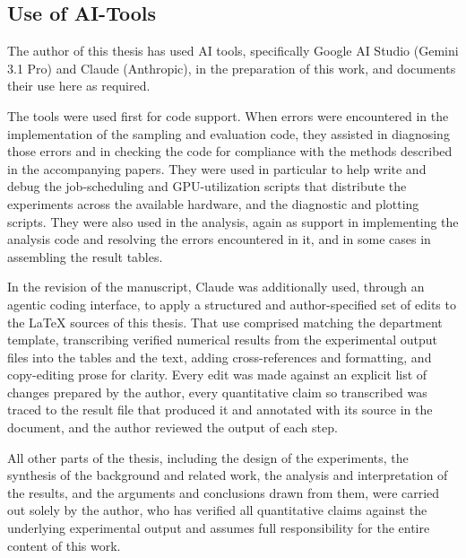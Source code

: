 \subsection{Use of AI-Tools}
\label{app:ai-tools}

The author of this thesis has used AI tools, specifically Google AI Studio (Gemini 3.1 Pro) and Claude (Anthropic), in the preparation of this work, and documents their use here as required.

The tools were used first for code support. When errors were encountered in the implementation of the sampling and evaluation code, they assisted in diagnosing those errors and in checking the code for compliance with the methods described in the accompanying papers. They were used in particular to help write and debug the job-scheduling and GPU-utilization scripts that distribute the experiments across the available hardware, and the diagnostic and plotting scripts. They were also used in the analysis, again as support in implementing the analysis code and resolving the errors encountered in it, and in some cases in assembling the result tables.

In the revision of the manuscript, Claude was additionally used, through an agentic coding interface, to apply a structured and author-specified set of edits to the LaTeX sources of this thesis. That use comprised matching the department template, transcribing verified numerical results from the experimental output files into the tables and the text, adding cross-references and formatting, and copy-editing prose for clarity. Every edit was made against an explicit list of changes prepared by the author, every quantitative claim so transcribed was traced to the result file that produced it and annotated with its source in the document, and the author reviewed the output of each step.

All other parts of the thesis, including the design of the experiments, the synthesis of the background and related work, the analysis and interpretation of the results, and the arguments and conclusions drawn from them, were carried out solely by the author, who has verified all quantitative claims against the underlying experimental output and assumes full responsibility for the entire content of this work.
